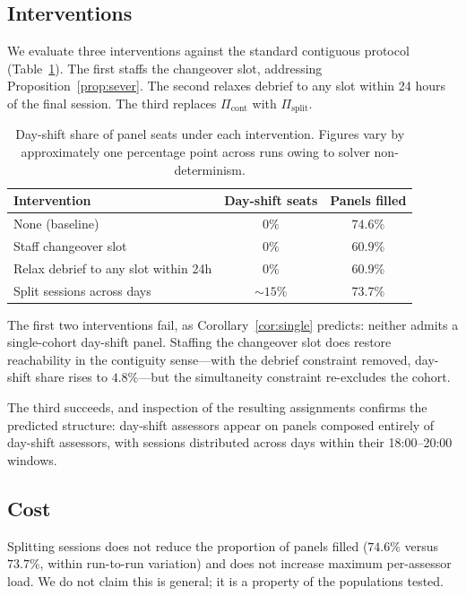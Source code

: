 \documentclass[11pt]{article}
\theoremstyle{definition}
\begin{document}
\subsection{Interventions}

We evaluate three interventions against the standard contiguous protocol
(Table~\ref{tab:interventions}). The first staffs the changeover slot, addressing
Proposition~\ref{prop:sever}. The second relaxes debrief to any slot within 24 hours of
the final session. The third replaces $\Pi_{\mathrm{cont}}$ with $\Pi_{\mathrm{split}}$.

\begin{table}[h]
\centering
\begin{tabular}{lcc}
\toprule
Intervention & Day-shift seats & Panels filled \\
\midrule
None (baseline)                       & $0\%$      & $74.6\%$ \\
Staff changeover slot                 & $0\%$      & $60.9\%$ \\
Relax debrief to any slot within 24h  & $0\%$      & $60.9\%$ \\
Split sessions across days            & $\sim15\%$ & $73.7\%$ \\
\bottomrule
\end{tabular}
\caption{Day-shift share of panel seats under each intervention. Figures vary by
approximately one percentage point across runs owing to solver non-determinism.}
\label{tab:interventions}
\end{table}

The first two interventions fail, as Corollary~\ref{cor:single} predicts: neither admits a
single-cohort day-shift panel. Staffing the changeover slot does restore reachability in
the contiguity sense---with the debrief constraint removed, day-shift share rises to
$4.8\%$---but the simultaneity constraint re-excludes the cohort.

The third succeeds, and inspection of the resulting assignments confirms the predicted
structure: day-shift assessors appear on panels composed entirely of day-shift assessors,
with sessions distributed across days within their 18:00--20:00 windows.

\subsection{Cost}

Splitting sessions does not reduce the proportion of panels filled ($74.6\%$ versus
$73.7\%$, within run-to-run variation) and does not increase maximum per-assessor load.
We do not claim this is general; it is a property of the populations tested.
\end{document}
